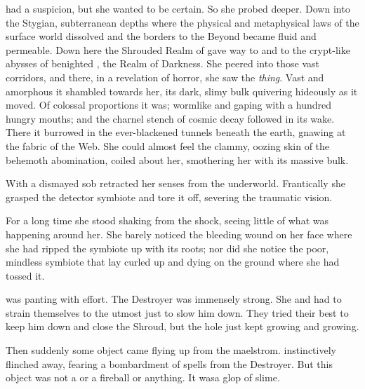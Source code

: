 \Criseis had a suspicion, but she wanted to be certain. 
So she probed deeper. 
Down into the Stygian, subterranean depths where the physical and metaphysical laws of the surface world dissolved and the borders to the Beyond became fluid and permeable. 
Down here the Shrouded Realm of \Azmith gave way to \Nyx and to the crypt-like abysses of benighted \Erebos, the Realm of Darkness. 
She peered into those vast corridors, and there, in a revelation of horror, she saw the \emph{thing}. 
Vast and amorphous it shambled towards her, its dark, slimy bulk quivering hideously as it moved. 
Of colossal proportions it was; wormlike and gaping with a hundred hungry mouths; and the charnel stench of cosmic decay followed in its wake. 
There it burrowed in the ever-blackened tunnels beneath the earth, gnawing at the fabric of the Web. 
She could almost feel the clammy, oozing skin of the behemoth abomination, coiled about her, smothering her with its massive bulk. 

With a dismayed sob \Criseis retracted her senses from the underworld. 
Frantically she grasped the detector symbiote and tore it off, severing the traumatic vision. 

For a long time she stood shaking from the shock, seeing little of what was happening around her. 
She barely noticed the bleeding wound on her face where she had ripped the symbiote up with its roots; nor did she notice the poor, mindless symbiote that lay curled up and dying on the ground where she had tossed it. 




\begin{comment}
  \subsection{\Resphan aftermath}
\end{comment}
\new
\Achsah was panting with effort. 
The Destroyer was immensely strong. 
She and \Ganethed had to strain themselves to the utmost just to slow him down. 
They tried their best to keep him down and close the Shroud, but the hole just kept growing and growing. 


Then suddenly some object came flying up from the maelstrom.
\Achsah instinctively flinched away, fearing a bombardment of spells from the Destroyer. 
But this object was not a \daemon or a fireball or anything. 
It was\prikker a glop of slime. 

